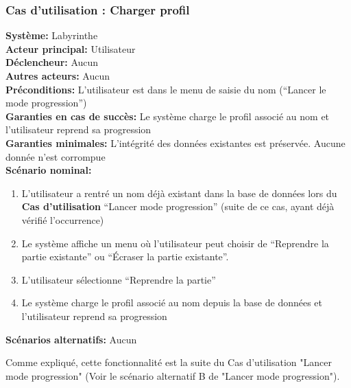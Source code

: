 \documentclass{butexFR}
\begin{document}
\subsubsection{Cas d'utilisation : Charger profil}
\textbf{Système:} Labyrinthe\\
\textbf{Acteur principal:} Utilisateur\\
\textbf{Déclencheur:} Aucun\\
\textbf{Autres acteurs:} Aucun\\[0.25em]
\textbf{Préconditions:} L'utilisateur est dans le menu de saisie du nom (``Lancer le mode progression'')\\
\textbf{Garanties en cas de succès:} Le système charge le profil associé au nom et l'utilisateur reprend sa progression\\
\textbf{Garanties minimales:} L'intégrité des données existantes est préservée. Aucune donnée n'est corrompue\\[0.25em]
\textbf{Scénario nominal:}
\begin{enumerate}
    \item L'utilisateur a rentré un nom déjà existant dans la base de données lors du \textbf{Cas d'utilisation} ``Lancer mode progression'' (suite de ce cas, ayant déjà vérifié l'occurrence)
    \item Le système affiche un menu où l'utilisateur peut choisir de ``Reprendre la partie existante'' ou ``Écraser la partie existante''.
    \item L'utilisateur sélectionne ``Reprendre la partie''
    \item Le système charge le profil associé au nom depuis la base de données et l'utilisateur reprend sa progression
\end{enumerate}
\textbf{Scénarios alternatifs:} Aucun


Comme expliqué, cette fonctionnalité est la suite du Cas d'utilisation "Lancer mode progression" (Voir le scénario alternatif B de "Lancer mode progression").

\newpage
\end{document}
